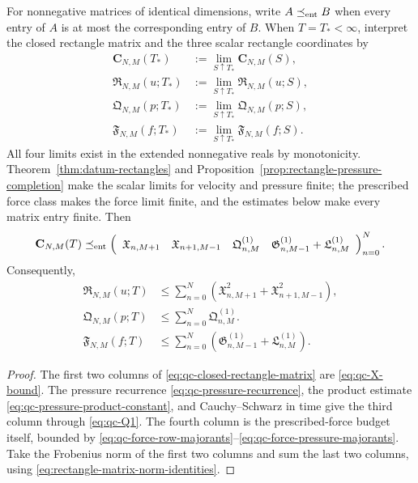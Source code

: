\begin{proposition}
\label{prop:qc-closed-rectangle-matrix}
For nonnegative matrices of identical dimensions, write
\(A\preceq_{\rm ent}B\) when every entry of \(A\) is at most the
corresponding entry of \(B\).  When \(T=T_*<\infty\), interpret the closed
rectangle matrix and the three scalar rectangle coordinates by
\begin{align*}
 \mathbf C_{N,M}(T_*)&:=
 \lim_{S\uparrow T_*}\mathbf C_{N,M}(S),\\
 \mathfrak R_{N,M}(u;T_*)&:=
 \lim_{S\uparrow T_*}\mathfrak R_{N,M}(u;S),\\
 \mathfrak Q_{N,M}(p;T_*)&:=
 \lim_{S\uparrow T_*}\mathfrak Q_{N,M}(p;S),\\
 \mathfrak F_{N,M}(f;T_*)&:=
 \lim_{S\uparrow T_*}\mathfrak F_{N,M}(f;S).
\end{align*}
All four limits exist in the extended nonnegative reals by monotonicity.
Theorem~\ref{thm:datum-rectangles} and
Proposition~\ref{prop:rectangle-pressure-completion} make the scalar limits
for velocity and pressure finite; the prescribed force class makes the force
limit finite, and the estimates below make every matrix entry finite.
Then
\begin{equation}
 \mathbf C_{N,M}(T)
 \preceq_{\rm ent}
 \left(
 \begin{array}{cccc}
  \mathfrak X_{n,M+1}
  &\mathfrak X_{n+1,M-1}
  &\mathfrak Q^{(1)}_{n,M}
  &\mathfrak G^{(1)}_{n,M-1}+\mathfrak L^{(1)}_{n,M}
 \end{array}
 \right)_{n=0}^{N}.
 \label{eq:qc-closed-rectangle-matrix}
\end{equation}
Consequently,
\begin{align}
 \mathfrak R_{N,M}(u;T)
 &\le\sum_{n=0}^{N}
 \left(\mathfrak X_{n,M+1}^2
       +\mathfrak X_{n+1,M-1}^2\right),
 \label{eq:qc-closed-rectangle-frobenius}\\
 \mathfrak Q_{N,M}(p;T)
 &\le\sum_{n=0}^{N}\mathfrak Q^{(1)}_{n,M}.
 \label{eq:qc-closed-pressure-column}\\
 \mathfrak F_{N,M}(f;T)
 &\le\sum_{n=0}^{N}
 \left(\mathfrak G^{(1)}_{n,M-1}+\mathfrak L^{(1)}_{n,M}\right).
 \label{eq:qc-closed-force-column}
\end{align}
\end{proposition}

\begin{proof}
The first two columns of \eqref{eq:qc-closed-rectangle-matrix} are
\eqref{eq:qc-X-bound}.  The pressure recurrence
\eqref{eq:qc-pressure-recurrence}, the product estimate
\eqref{eq:qc-pressure-product-constant}, and Cauchy--Schwarz in time give
the third column through \eqref{eq:qc-Q1}.  The fourth column is the
prescribed-force budget itself, bounded by
\eqref{eq:qc-force-row-majorants}--\eqref{eq:qc-force-pressure-majorants}.
Take the Frobenius norm of the first two columns and sum the last two columns, using
\eqref{eq:rectangle-matrix-norm-identities}.
\end{proof}

